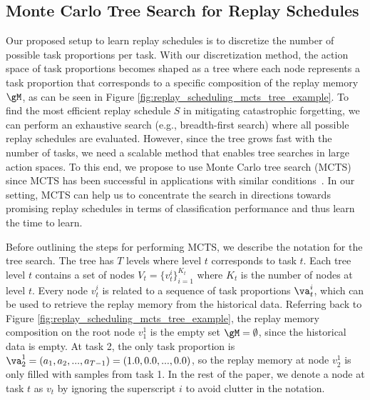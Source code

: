 
\subsection{Monte Carlo Tree Search for Replay Schedules}
\label{sec:mcts_for_replay_scheduling}


Our proposed setup to learn %
replay schedules is to discretize the number of possible task proportions per task. 
With our discretization method, the action space of task proportions becomes shaped as a tree where each node represents a task proportion that corresponds to a specific composition of the replay memory $\gM$, as can be seen in Figure \ref{fig:replay_scheduling_mcts_tree_example}. 
To find the most efficient replay schedule $S$ in mitigating catastrophic forgetting, we can perform an exhaustive search (e.g., breadth-first search) where all possible replay schedules are evaluated. 
However, since the tree grows fast with the number of tasks, we need a scalable method that enables tree searches in large action spaces. To this end, we propose to use Monte Carlo tree search (MCTS)~\citep{coulom2006efficient} since MCTS has been successful in applications with similar conditions~\citep{browne2012survey, chaudhry2018feature, gelly2006modification, silver2016mastering}.
In our setting, MCTS can help us to concentrate the search in directions towards promising replay schedules in terms of classification performance and thus learn the time to learn.

%

Before outlining the steps for performing MCTS, we describe the notation for the tree search. The tree has $T$ levels where level $t$ corresponds to task $t$. Each tree level $t$ contains a set of nodes $V_t = \{v_t^{i}\}_{i=1}^{K_t}$ where $K_t$ is the number of nodes at level $t$. 
Every node $v_t^{i}$ is related to a sequence of task proportions $\va_{t}^{i}$, which can be used to retrieve the replay memory from the historical data. 
Referring back to Figure \ref{fig:replay_scheduling_mcts_tree_example}, the replay memory composition on the root node $v_1^1$ is the empty set $\gM = \emptyset$, since the historical data is empty. At task 2, the only task proportion is $\va_{2}^1 = (a_1, a_2, ..., a_{T-1}) = (1.0, 0.0, ..., 0.0)$, so the replay memory at node $v_2^1$ is only filled with samples from task 1. In the rest of the paper, we denote a node at task $t$ as $v_t$ by ignoring the superscript $i$ to avoid clutter in the notation. 

